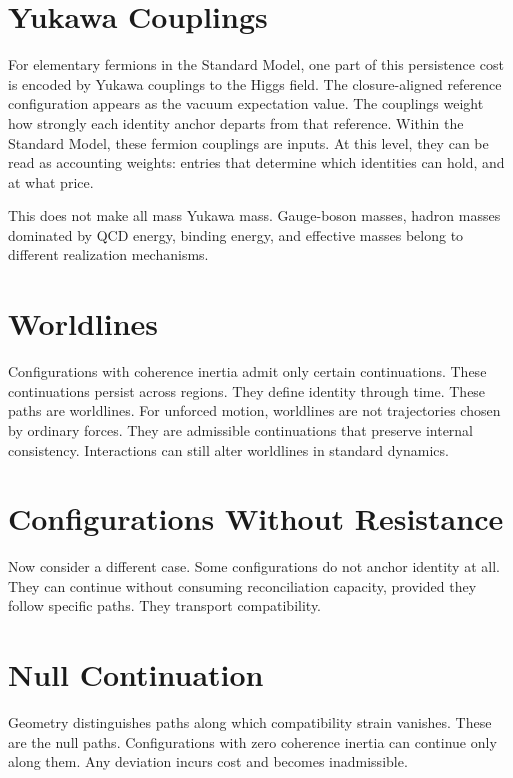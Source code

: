 \documentclass[11pt,twoside,openright]{book}
\begin{document}
\section*{Yukawa Couplings}

For elementary fermions in the Standard Model, one part of this persistence cost is encoded by Yukawa couplings to the Higgs field. The closure-aligned reference configuration appears as the vacuum expectation value. The couplings weight how strongly each identity anchor departs from that reference. Within the Standard Model, these fermion couplings are inputs. At this level, they can be read as accounting weights: entries that determine which identities can hold, and at what price.

This does not make all mass Yukawa mass. Gauge-boson masses, hadron masses dominated by QCD energy, binding energy, and effective masses belong to different realization mechanisms.

\section*{Worldlines}

Configurations with coherence inertia admit only certain continuations. These continuations persist across regions. They define identity through time. These paths are worldlines. For unforced motion, worldlines are not trajectories chosen by ordinary forces. They are admissible continuations that preserve internal consistency. Interactions can still alter worldlines in standard dynamics.

\section*{Configurations Without Resistance}

Now consider a different case. Some configurations do not anchor identity at all. They can continue without consuming reconciliation capacity, provided they follow specific paths. They transport compatibility.

\section*{Null Continuation}

Geometry distinguishes paths along which compatibility strain vanishes. These are the null paths. Configurations with zero coherence inertia can continue only along them. Any deviation incurs cost and becomes inadmissible.
\end{document}
